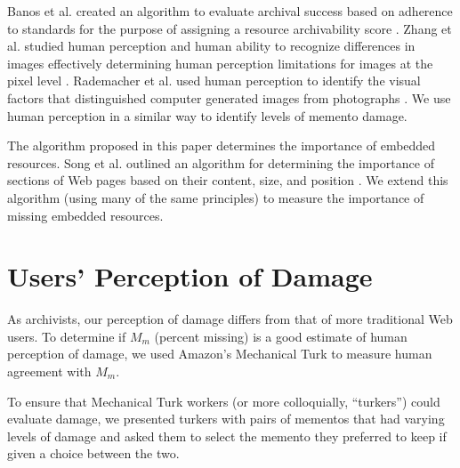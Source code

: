 Banos et al. created an algorithm to evaluate archival success based on adherence to standards for the purpose of assigning a resource archivability score \cite{ipresArchivability}. Zhang et al. studied human perception and human ability to recognize differences in images effectively determining human perception limitations for images at the pixel level \cite{Zhang200830}. Rademacher et al. used human perception to identify the visual factors that distinguished computer generated images from photographs \cite{rademacher}. We use human perception in a similar way to identify levels of memento damage.

The algorithm proposed in this paper determines the importance of embedded resources. Song et al. outlined an algorithm for determining the importance of sections of Web pages based on their content, size, and position \cite{blockImportance}. We extend this algorithm (using many of the same principles) to measure the importance of missing embedded resources. 



\section{Users' Perception of Damage}
\label{turk} 


As archivists, our perception of damage differs from that of more traditional Web users. To determine if $M_m$ (percent missing) is a good estimate of human perception of damage, we used Amazon's Mechanical Turk to measure human agreement with $M_m$.

To ensure that Mechanical Turk workers (or more colloquially, ``turkers'') could evaluate damage, we presented turkers with pairs of mementos that had varying levels of damage and asked them to select the memento they preferred to keep if given a choice between the two.

